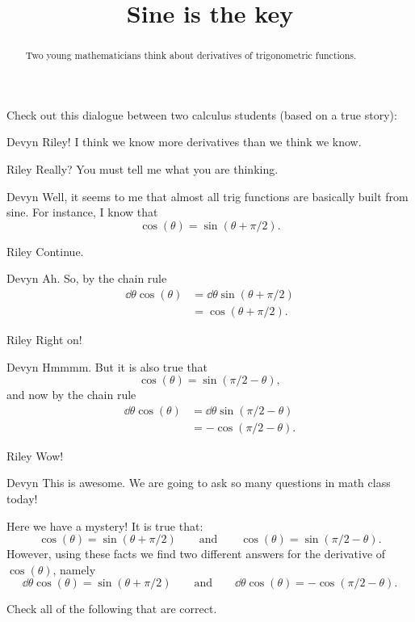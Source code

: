 \documentclass{ximera}
\title[Break-Ground:]{Sine is the key}
\begin{document}
\begin{abstract}
Two young mathematicians think about derivatives of trigonometric functions.
\end{abstract}
\maketitle

Check out this dialogue between two calculus students (based on a true
story):

\begin{dialogue}
\item[Devyn] Riley! I think we know more derivatives than we think we know.
\item[Riley] Really? You must tell me what you are thinking.
\item[Devyn] Well, it seems to me that almost all trig functions are
  basically built from sine. For instance, I know that 
  \[
  \cos(\theta)  = \sin(\theta + \pi/2).
  \]
\item[Riley] Continue.
\item[Devyn] Ah. So, by the chain rule
  \begin{align*}
  \dd{\theta}\cos(\theta) &= \dd{\theta} \sin(\theta + \pi/2)\\
  &=\cos(\theta + \pi/2).
  \end{align*}
\item[Riley] Right on!
\item[Devyn] Hmmmm. But it is also true that
  \[
  \cos(\theta) = \sin(\pi/2 - \theta), 
  \]
  and now by the chain rule
  \begin{align*}
  \dd{\theta}\cos(\theta) &= \dd{\theta}\sin(\pi/2-\theta)\\
  &=-\cos(\pi/2 - \theta).
  \end{align*}
\item[Riley] Wow!
\item[Devyn] This is awesome. We are going to ask so many questions in
  math class today!
\end{dialogue}

Here we have a mystery! It is true that:
\[
\cos(\theta)  = \sin(\theta + \pi/2) \qquad\text{and}\qquad\cos(\theta) = \sin(\pi/2 - \theta).
\]
However, using these facts we find two different answers for the derivative of $\cos(\theta)$, namely
\[
\dd{\theta} \cos(\theta) = \sin(\theta + \pi/2) \qquad\text{and}\qquad\dd{\theta}\cos(\theta) =-\cos(\pi/2 - \theta).
\]

\begin{problem}
  Check all of the following that are correct.
  \begin{selectAll}
  \end{selectAll}
\end{problem}
\end{document}
